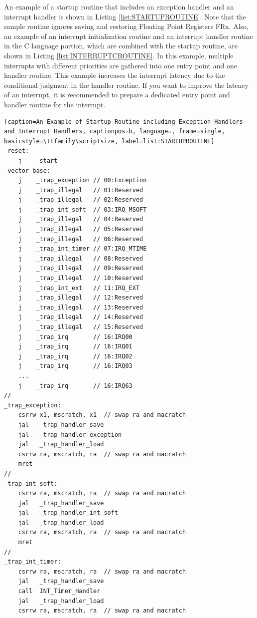 An example of a startup routine that includes an exception handler and an interrupt handler is shown in Listing \ref{list:STARTUPROUTINE}. Note that the sample routine ignores saving and restoring Floating Point Registers FRx. Also, an example of an interrupt initialization routine and an interrupt handler routine in the C language portion, which are combined with the startup routine, are shown in Listing \ref{list:INTERRUPTCROUTINE}. In this example, multiple interrupts with different priorities are gathered into one entry point and one handler routine. This example increases the interrupt latency due to the conditional judgment in the handler routine. If you want to improve the latency of an interrupt, it is recommended to prepare a dedicated entry point and handler routine for the interrupt.
\begin{lstlisting}[caption=An Example of Startup Routine including Exception Handlers and Interrupt Handlers, captionpos=b, language=, frame=single, basicstyle=\ttfamily\scriptsize, label=list:STARTUPROUTINE]
_reset:
    j    _start
_vector_base:
    j    _trap_exception // 00:Exception
    j    _trap_illegal   // 01:Reserved
    j    _trap_illegal   // 02:Reserved
    j    _trap_int_soft  // 03:IRQ_MSOFT
    j    _trap_illegal   // 04:Reserved
    j    _trap_illegal   // 05:Reserved
    j    _trap_illegal   // 06:Reserved
    j    _trap_int_timer // 07:IRQ_MTIME
    j    _trap_illegal   // 08:Reserved
    j    _trap_illegal   // 09:Reserved
    j    _trap_illegal   // 10:Reserved
    j    _trap_int_ext   // 11:IRQ_EXT
    j    _trap_illegal   // 12:Reserved
    j    _trap_illegal   // 13:Reserved
    j    _trap_illegal   // 14:Reserved
    j    _trap_illegal   // 15:Reserved
    j    _trap_irq       // 16:IRQ00
    j    _trap_irq       // 16:IRQ01
    j    _trap_irq       // 16:IRQ02
    j    _trap_irq       // 16:IRQ03
    ...
    j    _trap_irq       // 16:IRQ63
//
_trap_exception:
    csrrw x1, mscratch, x1  // swap ra and macratch
    jal   _trap_handler_save
    jal   _trap_handler_exception
    jal   _trap_handler_load
    csrrw ra, mscratch, ra  // swap ra and macratch
    mret
//
_trap_int_soft:
    csrrw ra, mscratch, ra  // swap ra and macratch
    jal   _trap_handler_save
    jal   _trap_handler_int_soft
    jal   _trap_handler_load
    csrrw ra, mscratch, ra  // swap ra and macratch
    mret
//
_trap_int_timer:
    csrrw ra, mscratch, ra  // swap ra and macratch
    jal   _trap_handler_save
    call  INT_Timer_Handler
    jal   _trap_handler_load
    csrrw ra, mscratch, ra  // swap ra and macratch

\end{lstlisting}
